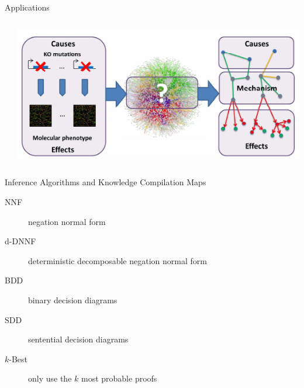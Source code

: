 \documentclass{beamer}
\begin{document}
\begin{frame}{Applications}
\begin{columns}[b]
\begin{column}{0.5\textwidth}
      {\small \cite{DBLP:conf/ilp/Corte-RealD017}}
    \end{column}
    \begin{column}{0.5\textwidth}
      \centering
      \includegraphics[width=\textwidth]{application4.png}
      {\small \cite{de2013phenetic}}
    \end{column}
  \end{columns}
\end{frame}

\begin{frame}{Inference Algorithms and Knowledge Compilation Maps}
  \begin{description}
  \item[NNF] negation normal form
  \item[d-DNNF] deterministic decomposable negation normal form
  \item[BDD] binary decision diagrams
  \item[SDD] sentential decision diagrams
  \item[$k$-Best] only use the $k$ most probable proofs
  \end{description}
\end{frame}
\end{document}
